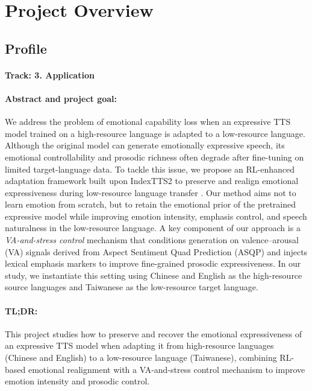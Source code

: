 \section{Project Overview}
\label{section:intro}

\subsection{Profile}

\paragraph{Track: 3. Application}

\paragraph{Abstract and project goal:}
We address the problem of emotional capability loss when an expressive TTS model trained on a high-resource language is adapted to a low-resource language. Although the original model can generate emotionally expressive speech, its emotional controllability and prosodic richness often degrade after fine-tuning on limited target-language data. To tackle this issue, we propose an RL-enhanced adaptation framework built upon IndexTTS2 to preserve and realign emotional expressiveness during low-resource language transfer \citep{Zhou2025IndexTTS2AB}. Our method aims not to learn emotion from scratch, but to retain the emotional prior of the pretrained expressive model while improving emotion intensity, emphasis control, and speech naturalness in the low-resource language. A key component of our approach is a \emph{VA-and-stress control} mechanism that conditions generation on valence--arousal (VA) signals derived from Aspect Sentiment Quad Prediction (ASQP) and injects lexical emphasis markers to improve fine-grained prosodic expressiveness. In our study, we instantiate this setting using Chinese and English as the high-resource source languages and Taiwanese as the low-resource target language.

\paragraph{TL;DR:}
This project studies how to preserve and recover the emotional expressiveness of an expressive TTS model when adapting it from high-resource languages (Chinese and English) to a low-resource language (Taiwanese), combining RL-based emotional realignment with a VA-and-stress control mechanism to improve emotion intensity and prosodic control.

